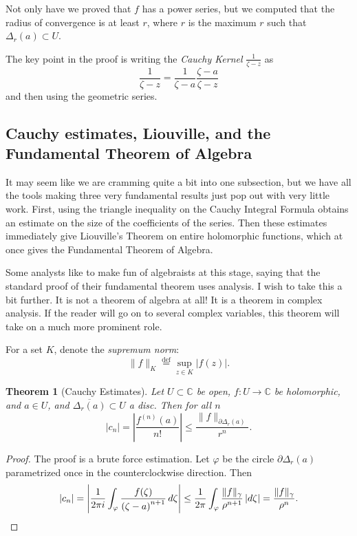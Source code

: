 \documentclass[12pt,openany]{book}
\newcommand{\sabs}[1]{\lvert {#1} \rvert}
\newcommand{\snorm}[1]{\lVert {#1} \rVert}
\newcommand{\abs}[1]{\left\lvert {#1} \right\rvert}
\newcommand{\C}{{\mathbb{C}}}
\newcommand{\myindex}[1]{#1\index{#1}}
\theoremstyle{plain}
\newtheorem{thm}{Theorem}[section]
\theoremstyle{remark}
\theoremstyle{definition}
\theoremstyle{exercise}
\theoremstyle{example}
\begin{document}
Not only have we proved that $f$ has a power series, but we computed
that the radius of convergence is at least $r$, where $r$ is the maximum $r$
such that $\Delta_r(a) \subset U$.

The key point in the proof is writing the \emph{\myindex{Cauchy Kernel}}
$\frac{1}{\zeta-z}$ as
\begin{equation*}
\frac{1}{\zeta-z}
=
\frac{1}{\zeta-a}
\frac{\zeta-a}{\zeta-z}
\end{equation*}
and then using the geometric series.

\subsection{Cauchy estimates, Liouville, and the Fundamental Theorem of
Algebra}

It may seem like we are cramming quite a bit into one subsection, but
we have all the tools making three very fundamental results just pop out
with very little work.  First, using the triangle inequality on
the Cauchy Integral Formula obtains an estimate on the size of the
coefficients of the series.  Then these estimates immediately give
Liouville's Theorem on entire holomorphic functions, which at once gives the
Fundamental Theorem of Algebra.

Some analysts like to make fun of algebraists at this stage, saying that the
standard proof of their fundamental theorem uses analysis.  I wish to take
this a bit further.  It is not a theorem of algebra at all!  It is a theorem
in complex analysis.
If the reader will go on to several complex variables, this theorem will
take on a much more prominent role.

For a set $K$, denote the \emph{\myindex{supremum norm}}:
%
\begin{equation*}
\snorm{f}_K
\overset{\text{def}}{=}
\sup_{z \in K} \sabs{f(z)} .
\end{equation*}

\begin{thm}[Cauchy Estimates]
Let $U \subset \C$ be open, $f \colon U \to \C$ be
holomorphic, and $a \in U$, and $\overline{\Delta_r(a)} \subset U$
a disc.
Then for all $n$
\begin{equation*}
\sabs{c_n} =
\abs{\frac{f^{(n)}(a)}{n!}}
\leq
\frac{\snorm{f}_{\partial \Delta_r(a)}}{r^{n}} .
\end{equation*}
\end{thm}

\begin{proof}
The proof is a brute force estimation.  Let $\varphi$ be
the circle $\partial \Delta_r(a)$ parametrized once in the counterclockwise
direction.  Then
\begin{equation*}
\sabs{c_n} = 
\abs{
\frac{1}{2\pi i}
\int_{\varphi}
\frac{f(\zeta)}{{(\zeta-a)}^{n+1}}
\,
d \zeta 
}
\leq
\frac{1}{2\pi}
\int_{\varphi}
\frac{\snorm{f}_{\gamma}}{\rho^{n+1}}
\,
\sabs{d \zeta} 
=
\frac{\snorm{f}_{\gamma}}{\rho^{n}} .
\qedhere
\end{equation*}
\end{proof}
\end{document}
